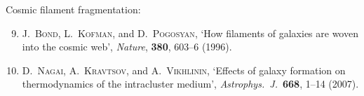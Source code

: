 \noindent
Cosmic filament fragmentation:
\begin{enumerate}
\setcounter{enumi}{8}
\item J.~\textsc{Bond}, L.~\textsc{Kofman}, and D.~\textsc{Pogosyan},
  `How filaments of galaxies are woven into the cosmic web',
  \emph{Nature}, \textbf{380}, 603--6 (1996).

\item D.~\textsc{Nagai}, A.~\textsc{Kravtsov}, and A.~\textsc{Vikhlinin},
  `Effects of galaxy formation on thermodynamics of the intracluster
  medium', \emph{Astrophys.\ J.}\ \textbf{668}, 1--14 (2007).
\end{enumerate}
